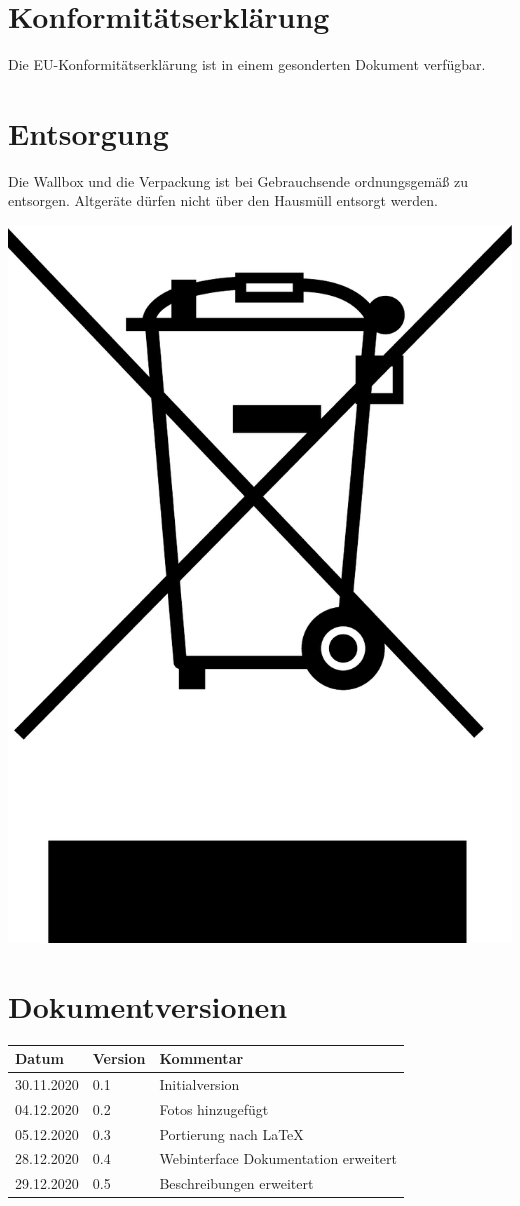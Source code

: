 \documentclass[a4paper,10pt]{article}
\begin{document}
\begin{multicols*}{2}
	\section{Konformitätserklärung}
	Die EU-Konformitätserklärung ist in einem gesonderten Dokument verfügbar.

	\section{Entsorgung}
	Die Wallbox und die Verpackung ist bei Gebrauchsende ordnungsgemäß zu
	entsorgen. Altgeräte dürfen nicht über den Hausmüll entsorgt werden.

	\includegraphics[width=0.2\linewidth]{./img/resized/weee.pdf}

	\section{Dokumentversionen}
	\begin{tabular}{lll}
		\toprule
		Datum      & Version & Kommentar              \\
		\midrule
		30.11.2020 & 0.1     & Initialversion         \\
		04.12.2020 & 0.2     & Fotos hinzugefügt      \\
		05.12.2020 & 0.3     & Portierung nach \LaTeX \\
		28.12.2020 & 0.4     & Webinterface Dokumentation erweitert \\
		29.12.2020 & 0.5     & Beschreibungen erweitert \\
		\bottomrule
	\end{tabular}

\end{multicols*}

\end{document}

